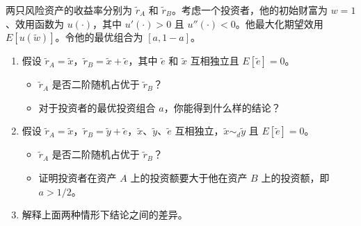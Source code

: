 \begin{problem}
 两只风险资产的收益率分别为 $\tilde{r}_{A}$ 和 $\tilde{r}_{B}$。考虑一个投资者，他的初始财富为 $w=1$、效用函数为 $u(\cdot)$，其中 $u'(\cdot)>0$ 且 $u''(\cdot)<0$。他最大化期望效用 $E[u(\tilde{w})]$。令他的最优组合为 $[a,1-a]$。
\begin{enumerate}[label=(\alph*)]
    \item 假设 $\tilde{r}_{A}=\tilde{x}$，$\tilde{r}_{B}=\tilde{x}+\tilde{e}$，其中 $\tilde{e}$ 和 $\tilde{x}$ 互相独立且 $E[\tilde{e}]=0$。
    \begin{itemize}
        \item $\tilde{r}_{A}$ 是否二阶随机占优于 $\tilde{r}_{B}$？
        \item 对于投资者的最优投资组合 $a$，你能得到什么样的结论？
    \end{itemize}
    \item 假设 $\tilde{r}_{A}=\tilde{x}$，$\tilde{r}_{B}=\tilde{y}+\tilde{e}$，$\tilde{x}$、$\tilde{y}$、$\tilde{e}$ 互相独立，$\tilde{x}\sim_{d}\tilde{y}$ 且 $E[\tilde{e}]=0$。
    \begin{itemize}
        \item $\tilde{r}_{A}$ 是否二阶随机占优于 $\tilde{r}_{B}$？
        \item 证明投资者在资产 $A$ 上的投资额要大于他在资产 $B$ 上的投资额，即 $a>1/2$。
    \end{itemize}
    \item 解释上面两种情形下结论之间的差异。
\end{enumerate}
\end{problem}
